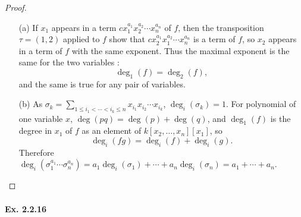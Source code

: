 \documentclass[11pt,a4paper]{article}
\begin{document}
\begin{proof}
\begin{enumerate}
\item[(a)]  If $x_1$ appears in a term $c x_1^{a_1}x_2^{a_2}\cdots x_n^{a_n}$ of $f$, then the transposition $\tau=(1,2)$ applied to $f$ show that $c x_2^{a_1}x_1^{a_2}\cdots x_n^{a_n}$ is a term of $f$, so $x_2$ appears in a term of $f$ with the same exponent. Thus the maximal exponent is the same for the two variables : $$\deg_1(f) = \deg_2(f),$$
and the same is true for any pair of variables.

\item[(b)] 
As $\sigma_k = \sum\limits_{1\leq i_1 < \cdots<i_k\leq n} x_{i_1}x_{i_2}\cdots x_{i_k}$, $\deg_i(\sigma_k) = 1$.
For polynomial of one variable $x$, $\deg(pq) = \deg(p) + \deg(q)$, and $\deg_1(f)$ is the degree in $x_1$ of $f$ as an element of $k[x_2,\ldots,x_n][x_1]$, so
$$\deg_i(fg) = \deg_i(f)+ \deg_i(g).$$
Therefore
$\deg_i(\sigma_1^{a_1}\cdots \sigma_n^{a_n}) = a_1 \deg_i(\sigma_1) + \cdots + a_n\deg_i(\sigma_n) = a_1+\cdots+a_n$.
\end{enumerate}
\end{proof}

\paragraph{Ex. 2.2.16}
\end{document}
